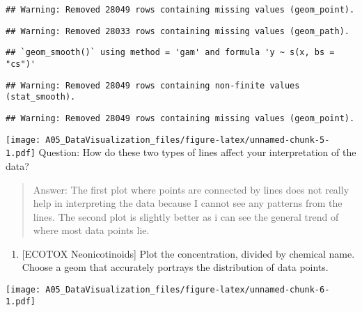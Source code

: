 \documentclass[]{article}
\newenvironment{Shaded}{\begin{snugshade}}{\end{snugshade}}
\newcommand{\KeywordTok}[1]{\textcolor[rgb]{0.13,0.29,0.53}{\textbf{#1}}}
\newcommand{\DataTypeTok}[1]{\textcolor[rgb]{0.13,0.29,0.53}{#1}}
\newcommand{\DecValTok}[1]{\textcolor[rgb]{0.00,0.00,0.81}{#1}}
\newcommand{\StringTok}[1]{\textcolor[rgb]{0.31,0.60,0.02}{#1}}
\newcommand{\CommentTok}[1]{\textcolor[rgb]{0.56,0.35,0.01}{\textit{#1}}}
\newcommand{\OperatorTok}[1]{\textcolor[rgb]{0.81,0.36,0.00}{\textbf{#1}}}
\newcommand{\NormalTok}[1]{#1}
\providecommand{\tightlist}{%
  \setlength{\itemsep}{0pt}\setlength{\parskip}{0pt}}
\begin{document}
\begin{verbatim}
## Warning: Removed 28049 rows containing missing values (geom_point).
\end{verbatim}

\begin{verbatim}
## Warning: Removed 28033 rows containing missing values (geom_path).
\end{verbatim}

\begin{verbatim}
## `geom_smooth()` using method = 'gam' and formula 'y ~ s(x, bs = "cs")'
\end{verbatim}

\begin{verbatim}
## Warning: Removed 28049 rows containing non-finite values (stat_smooth).
\end{verbatim}

\begin{verbatim}
## Warning: Removed 28049 rows containing missing values (geom_point).
\end{verbatim}

\texttt{[image: A05\_DataVisualization\_files/figure-latex/unnamed-chunk-5-1.pdf]}
Question: How do these two types of lines affect your interpretation of
the data?

\begin{quote}
Answer: The first plot where points are connected by lines does not
really help in interpreting the data because I cannot see any patterns
from the lines. The second plot is slightly better as i can see the
general trend of where most data points lie.
\end{quote}

\begin{enumerate}
\def\labelenumi{\arabic{enumi}.}
\setcounter{enumi}{6}
\tightlist
\item
  {[}ECOTOX Neonicotinoids{]} Plot the concentration, divided by
  chemical name. Choose a geom that accurately portrays the distribution
  of data points.
\end{enumerate}

\begin{Shaded}
\end{Shaded}

\texttt{[image: A05\_DataVisualization\_files/figure-latex/unnamed-chunk-6-1.pdf]}
\end{document}
